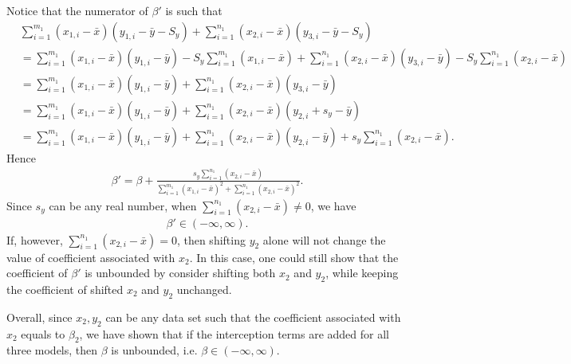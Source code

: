 \documentclass[12pt]{article}
\newcommand{\n}{n}
\newcommand{\nln}[1]{\n_{1}}
\newcommand{\m}{m}
\newcommand{\mln}[1]{\m_{1}}
\newcommand{\x}{x}
\newcommand{\y}{y}
\newcommand{\yln}[1]{y_{#1}}
\newcommand{\xln}[1]{x_{#1}}
\newcommand{\bet}{\beta}
\newcommand{\betln}[1]{\bet_{#1}}
\newcommand{\mean}[1]{ \bar{#1} }
\begin{document}
Notice that the numerator of $\bet'$ is such that
\begin{align*}
	&\sum_{i= 1}^{\mln{1}} (\xln{1,i}  -  \mean{\x})(\yln{1,i}  - \mean{\y} - S_y) + \sum_{i= 1}^{\nln{1}} ( \xln{2,i}  -  \mean{\x})(\yln{3,i}  - \mean{\y} - S_y) \\
	& = \sum_{i= 1}^{\mln{1}} (\xln{1,i}  -  \mean{\x})(\yln{1,i}  - \mean{\y}) - S_y \sum_{i= 1}^{\mln{1}} (\xln{1,i}  -  \mean{\x}) + \sum_{i= 1}^{\nln{1}} ( \xln{2,i}  -  \mean{\x})(\yln{3,i}  - \mean{\y}) - S_y\sum_{i= 1}^{\nln{1}} ( \xln{2,i}  -  \mean{\x})\\
	& = \sum_{i= 1}^{\mln{1}} (\xln{1,i}  -  \mean{\x})(\yln{1,i}  - \mean{\y}) + \sum_{i= 1}^{\nln{1}} ( \xln{2,i}  -  \mean{\x})(\yln{3,i}  - \mean{\y})\\
	& = \sum_{i= 1}^{\mln{1}} (\xln{1,i}  -  \mean{\x})(\yln{1,i}  - \mean{\y}) + \sum_{i= 1}^{\nln{1}} ( \xln{2,i}  -  \mean{\x})(\yln{2,i} + s_y  - \mean{\y}) \\
	& = \sum_{i= 1}^{\mln{1}} (\xln{1,i}  -  \mean{\x})(\yln{1,i}  - \mean{\y}) + \sum_{i= 1}^{\nln{1}} ( \xln{2,i}  -  \mean{\x})(\yln{2,i}  - \mean{\y}) + s_y\sum_{i= 1}^{\nln{1}} ( \xln{2,i}  -  \mean{\x}).
\end{align*}
Hence
\begin{align*}
	\bet' = \beta + \frac{s_y\sum_{i= 1}^{\nln{1}} ( \xln{2,i}  -  \mean{\x})}{\sum_{i=1}^{\mln{1}} (\xln{1,i} -  \mean{\x})^2 + \sum_{i=1}^{\nln{1}} (\xln{2,i} -  \mean{\x})^2}.
\end{align*}
Since $s_y$ can be any real number, when $\sum_{i= 1}^{\nln{1}} ( \xln{2,i}  -  \mean{\x}) \neq 0$,
we have
\begin{align*}
	\bet' \in (-\infty, \infty).
\end{align*}
If, however, $\sum_{i= 1}^{\nln{1}} ( \xln{2,i}  -  \mean{\x}) = 0$, then shifting
$y_2$ alone will not change the value of coefficient associated with $\xln{2}$.
In this case, one could still show that the coefficient of $\beta'$ is unbounded
by consider shifting both $\xln{2}$ and $\yln{2}$, while
keeping the coefficient of shifted $\xln{2}$ and $\yln{2}$ unchanged.

Overall, since $\xln{2}, \yln{2}$ can be any data set such that the coefficient
associated with $\xln{2}$ equals to $\betln{2}$, we have shown that if 
the interception terms are added for all three models,  
then $\bet$ is unbounded, i.e. $\bet \in (-\infty, \infty)$.
\end{document}
